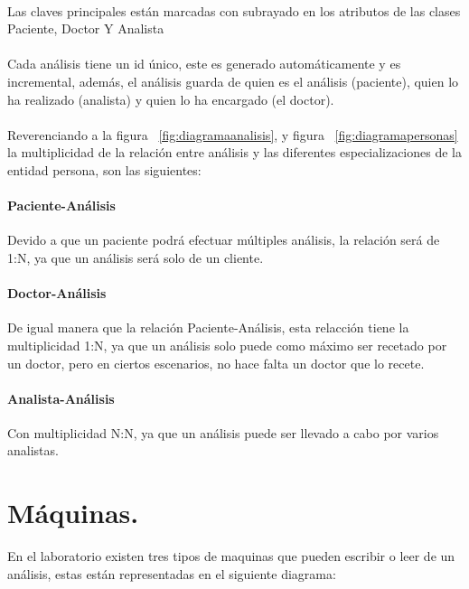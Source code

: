 \documentclass[a4paper,10pt]{article}
\begin{document}
\paragraph{}
Las claves principales están marcadas con subrayado en los atributos de las clases Paciente, Doctor Y Analista
\paragraph{}
Cada análisis tiene un id único, este es generado automáticamente y es incremental, además, el análisis guarda de quien es el análisis (paciente), quien lo ha realizado (analista) y quien lo ha encargado (el doctor).
\paragraph{}
Reverenciando a la figura ~\ref{fig:diagramaanalisis}, y figura ~\ref{fig:diagramapersonas} la multiplicidad de la relación entre análisis y las diferentes especializaciones de la entidad persona, son las siguientes:
\paragraph{Paciente-Análisis}
Devido a que un paciente podrá efectuar múltiples análisis, la relación será de 1:N, ya que un análisis será solo de un cliente.
\paragraph{Doctor-Análisis}
De igual manera que la relación Paciente-Análisis, esta relacción tiene la multiplicidad 1:N, ya que un análisis solo puede como máximo ser recetado por un doctor, pero en ciertos escenarios, no hace falta un doctor que lo recete.
\paragraph{Analista-Análisis}
Con multiplicidad N:N, ya que un análisis puede ser llevado a cabo por varios analistas.

\section{Máquinas.}
En el laboratorio existen tres tipos de maquinas que pueden escribir o leer de un análisis, estas están representadas en el siguiente diagrama:
\end{document}
